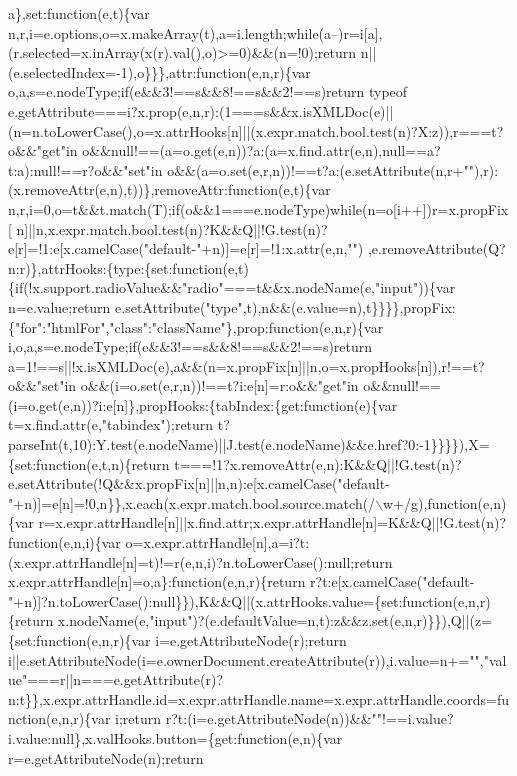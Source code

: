 \begin{DoxyCode}
{       a\},set:function(e,t)\{var
       n,r,i=e.options,o=x.makeArray(t),a=i.length;while(a--)r=i[a],(r.selected=x.inArray(x(r).val(),o)>=0)&&(n=!0);return n||(e.selectedIndex=-1),o\}\}\},attr:function(e,n,r)\{var
       o,a,s=e.nodeType;if(e&&3!==s&&8!==s&&2!==s)return typeof
       e.getAttribute===i?x.prop(e,n,r):(1===s&&x.isXMLDoc(e)||(n=n.toLowerCase(),o=x.attrHooks[n]||(x.expr.match.bool.test(n)?X:z)),r===t?o&&"get"in
       o&&null!==(a=o.get(e,n))?a:(a=x.find.attr(e,n),null==a?t:a):null!==r?o&&"set"in
       o&&(a=o.set(e,r,n))!==t?a:(e.setAttribute(n,r+""),r):(x.removeAttr(e,n),t))\},removeAttr:function(e,t)\{var
       n,r,i=0,o=t&&t.match(T);if(o&&1===e.nodeType)while(n=o[i++])r=x.propFix[
      n]||n,x.expr.match.bool.test(n)?K&&Q||!G.test(n)?e[r]=!1:e[x.camelCase("default-"+n)]=e[r]=!1:x.attr(e,n,"")
      ,e.removeAttribute(Q?n:r)\},attrHooks:\{type:\{set:function(e,t)\{if(!x.support.radioValue&&"radio"===t&&x.nodeName(e,"input"))\{var n=e.value;return
       e.setAttribute("type",t),n&&(e.value=n),t\}\}\}\},propFix:\{"for":"htmlFor","class":"className"\},prop:function(e,n,r)\{var i,o,a,s=e.nodeType;if(e&&3!==s&&8!==s&&2!==s)return
       a=1!==s||!x.isXMLDoc(e),a&&(n=x.propFix[n]||n,o=x.propHooks[n]),r!==t?o&&"set"in
       o&&(i=o.set(e,r,n))!==t?i:e[n]=r:o&&"get"in o&&null!==(i=o.get(e,n))?i:e[n]\},propHooks:\{tabIndex:\{get:function(e)\{var
       t=x.find.attr(e,"tabindex");return
       t?parseInt(t,10):Y.test(e.nodeName)||J.test(e.nodeName)&&e.href?0:-1\}\}\}\}),X=\{set:function(e,t,n)\{return
       t===!1?x.removeAttr(e,n):K&&Q||!G.test(n)?e.setAttribute(!Q&&x.propFix[n]||n,n):e[x.camelCase("default-"+n)]=e[n]=!0,n\}\},x.each(x.expr.match.bool.source.match(/\(\backslash\)w+/g),function(e,n)\{var
       r=x.expr.attrHandle[n]||x.find.attr;x.expr.attrHandle[n]=K&&Q||!G.test(n)?function(e,n,i)\{var
       o=x.expr.attrHandle[n],a=i?t:(x.expr.attrHandle[n]=t)!=r(e,n,i)?n.toLowerCase():null;return x.expr.attrHandle[n]=o,a\}:function(e,n,r)\{return
       r?t:e[x.camelCase("default-"+n)]?n.toLowerCase():null\}\}),K&&Q||(x.attrHooks.value=\{set:function(e,n,r)\{return
       x.nodeName(e,"input")?(e.defaultValue=n,t):z&&z.set(e,n,r)\}\}),Q||(z=\{set:function(e,n,r)\{var
       i=e.getAttributeNode(r);return
       i||e.setAttributeNode(i=e.ownerDocument.createAttribute(r)),i.value=n+="","value"===r||n===e.getAttribute(r)?n:t\}\},x.expr.attrHandle.id=x.expr.attrHandle.name=x.expr.attrHandle.coords=function(e,n,r)\{var
       i;return r?t:(i=e.getAttributeNode(n))&&""!==i.value?i.value:null\},x.valHooks.button=\{get:function(e,n)\{var
       r=e.getAttributeNode(n);return
}
\end{DoxyCode}

